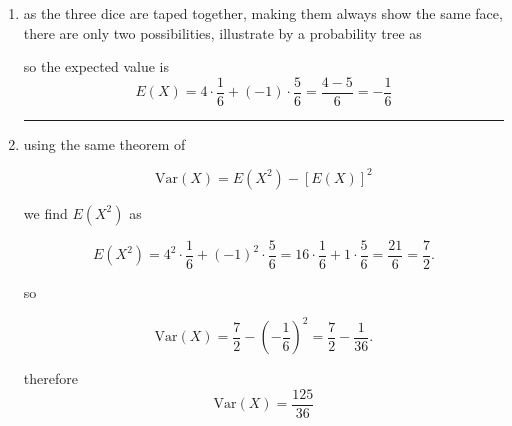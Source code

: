 \begin{enumerate}
    hence, 

    \begin{align*}
        \mathrm{Var}(X) &= \frac{23}{18}-\left(-\frac{2}{27}\right)^2\\ &= \boxed{\frac{1855}{1458}}
    \end{align*}

    \medskip
    \begin{center}
    \rule{0.3\linewidth}{0.2pt}
    \end{center}
    \medskip

    \item as the three dice are taped together, making them always show the same face, there are only two possibilities, illustrate by a probability tree as

\begin{center}
\end{center}

so the expected value is
\[
E(X)=4\cdot\frac16+(-1)\cdot\frac56=\frac{4-5}{6}
= \boxed{-\frac{1}{6}}
\]



    \medskip
    \begin{center}
    \rule{0.3\linewidth}{0.2pt}
    \end{center}
    \medskip

\item using the same theorem of

\[
\mathrm{Var}(X)=E(X^2)-[E(X)]^2 
\]
    
we find $E(X^2)$ as

\[
E(X^2)=4^2\cdot\frac16+(-1)^2\cdot\frac56
=16\cdot\frac16+1\cdot\frac56
=\frac{21}{6}
=\frac72.
\]

so

\[
\mathrm{Var}(X)=\frac72-\left(-\frac16\right)^2
=\frac72-\frac1{36}.
\]

therefore
\[
\boxed{\mathrm{Var}(X)=\frac{125}{36}}
\]
\end{enumerate}


